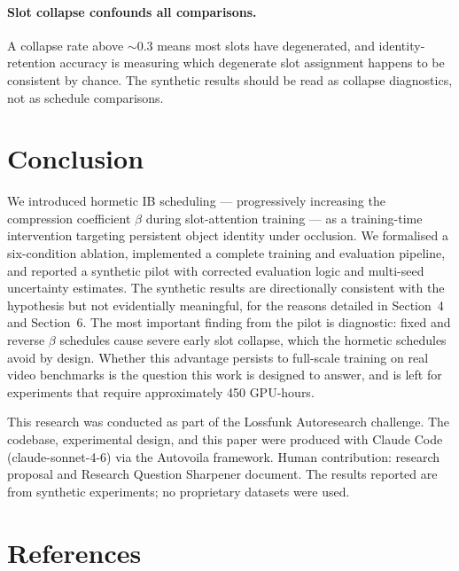 \documentclass{article}
\begin{document}
\paragraph{Slot collapse confounds all comparisons.}
A collapse rate above $\sim$0.3 means most slots have degenerated, and
identity-retention accuracy is measuring which degenerate slot assignment
happens to be consistent by chance.
The synthetic results should be read as collapse diagnostics, not as
schedule comparisons.


\section{Conclusion}

We introduced hormetic IB scheduling --- progressively increasing the
compression coefficient $\beta$ during slot-attention training --- as a
training-time intervention targeting persistent object identity under occlusion.
We formalised a six-condition ablation, implemented a complete training and
evaluation pipeline, and reported a synthetic pilot with corrected evaluation
logic and multi-seed uncertainty estimates.
The synthetic results are directionally consistent with the hypothesis but not
evidentially meaningful, for the reasons detailed in Section~4 and Section~6.
The most important finding from the pilot is diagnostic: fixed and reverse
$\beta$ schedules cause severe early slot collapse, which the hormetic schedules
avoid by design.
Whether this advantage persists to full-scale training on real video benchmarks
is the question this work is designed to answer, and is left for experiments
that require approximately 450 GPU-hours.

\begin{ack}
This research was conducted as part of the Lossfunk Autoresearch challenge.
The codebase, experimental design, and this paper were produced with Claude Code
(claude-sonnet-4-6) via the Autovoila framework.
Human contribution: research proposal and Research Question Sharpener document.
The results reported are from synthetic experiments; no proprietary datasets were used.
\end{ack}

\section*{References}

\small
\end{document}
